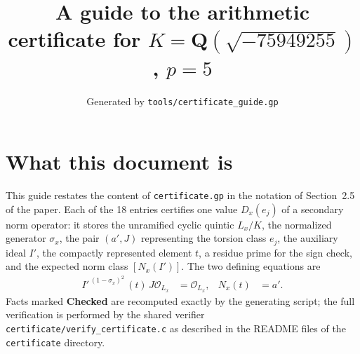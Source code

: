 \documentclass[11pt]{article}
\title{A guide to the arithmetic certificate for $K=\mathbf Q(\sqrt{-75949255})$, $p=5$}
\author{}
\date{Generated by \texttt{tools/certificate\_guide.gp}}
\begin{document}
\maketitle
\section*{What this document is}
This guide restates the content of \texttt{certificate.gp} in the
notation of Section~2.5 of the paper.  Each of the 18 entries
certifies one value $D_x(e_j)$ of a secondary norm operator: it
stores the unramified cyclic quintic $L_x/K$, the normalized
generator $\sigma_x$, the pair $(a',J)$ representing the torsion
class $e_j$, the auxiliary ideal $I'$, the compactly represented
element $t$, a residue prime for the sign check, and the expected
norm class $[N_x(I')]$.  The two defining equations are
\begin{align*}
I'^{\,(1-\sigma_x)^2}\,(t)\,J\mathcal O_{L_x}&=\mathcal O_{L_x},&
N_x(t)&=a'.
\end{align*}
Facts marked \textbf{Checked} are recomputed exactly by the
generating script; the full verification is performed by the
shared verifier \texttt{certificate/verify\_certificate.c} as
described in the README files of the \texttt{certificate}
directory.
\end{document}
